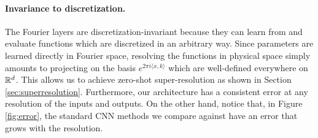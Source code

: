 \documentclass{article} %
\newcommand{\nik}[1]{\textcolor{blue}{{\bf Nik:}  #1}}
\newcommand{\cG}{\mathcal{F}}
\begin{document}




\paragraph{Invariance to discretization.}
The Fourier layers are discretization-invariant because they can learn from and evaluate functions which are discretized in an arbitrary way. Since parameters are learned directly in Fourier space, resolving the functions in physical space simply amounts to projecting on the basis $e^{2\pi i \langle x, k \rangle}$ which are well-defined everywhere on $\mathbb{R}^d$. This allows us to achieve zero-shot super-resolution as shown in Section \ref{sec:superresolution}.
Furthermore, our architecture has a consistent error at any resolution of the inputs and outputs. On the other hand, notice that, in Figure \ref{fig:error}, the standard CNN methods we compare against have an error that grows with the resolution.  
\end{document}
